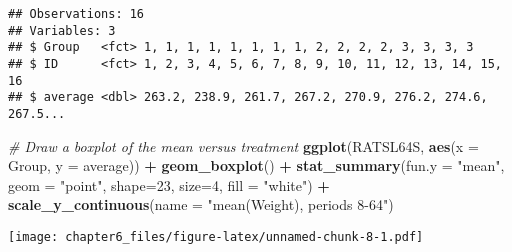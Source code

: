 \documentclass[]{article}
\newenvironment{Shaded}{\begin{snugshade}}{\end{snugshade}}
\newcommand{\CommentTok}[1]{\textcolor[rgb]{0.56,0.35,0.01}{\textit{#1}}}
\newcommand{\DataTypeTok}[1]{\textcolor[rgb]{0.13,0.29,0.53}{#1}}
\newcommand{\DecValTok}[1]{\textcolor[rgb]{0.00,0.00,0.81}{#1}}
\newcommand{\FloatTok}[1]{\textcolor[rgb]{0.00,0.00,0.81}{#1}}
\newcommand{\KeywordTok}[1]{\textcolor[rgb]{0.13,0.29,0.53}{\textbf{#1}}}
\newcommand{\NormalTok}[1]{#1}
\newcommand{\OperatorTok}[1]{\textcolor[rgb]{0.81,0.36,0.00}{\textbf{#1}}}
\newcommand{\StringTok}[1]{\textcolor[rgb]{0.31,0.60,0.02}{#1}}
\begin{document}
\begin{verbatim}
## Observations: 16
## Variables: 3
## $ Group   <fct> 1, 1, 1, 1, 1, 1, 1, 1, 2, 2, 2, 2, 3, 3, 3, 3
## $ ID      <fct> 1, 2, 3, 4, 5, 6, 7, 8, 9, 10, 11, 12, 13, 14, 15, 16
## $ average <dbl> 263.2, 238.9, 261.7, 267.2, 270.9, 276.2, 274.6, 267.5...
\end{verbatim}

\begin{Shaded}
\begin{Highlighting}[]
\CommentTok{# Draw a boxplot of the mean versus treatment}
\KeywordTok{ggplot}\NormalTok{(RATSL64S, }\KeywordTok{aes}\NormalTok{(}\DataTypeTok{x =}\NormalTok{ Group, }\DataTypeTok{y =}\NormalTok{ average)) }\OperatorTok{+}
\StringTok{  }\KeywordTok{geom_boxplot}\NormalTok{() }\OperatorTok{+}
\StringTok{  }\KeywordTok{stat_summary}\NormalTok{(}\DataTypeTok{fun.y =} \StringTok{"mean"}\NormalTok{, }\DataTypeTok{geom =} \StringTok{"point"}\NormalTok{, }\DataTypeTok{shape=}\DecValTok{23}\NormalTok{, }\DataTypeTok{size=}\DecValTok{4}\NormalTok{, }\DataTypeTok{fill =} \StringTok{"white"}\NormalTok{) }\OperatorTok{+}
\StringTok{  }\KeywordTok{scale_y_continuous}\NormalTok{(}\DataTypeTok{name =} \StringTok{"mean(Weight), periods 8-64"}\NormalTok{)}
\end{Highlighting}
\end{Shaded}

\texttt{[image: chapter6\_files/figure-latex/unnamed-chunk-8-1.pdf]}

\begin{Shaded}
\end{Shaded}
\end{document}
